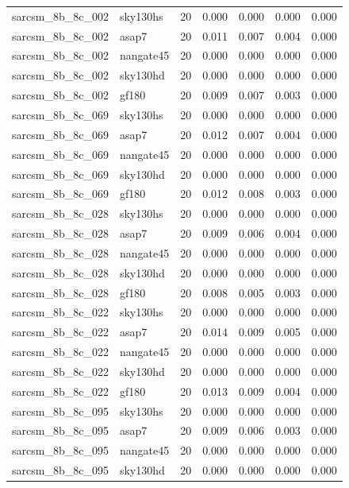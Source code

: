 \begin{tabular}{llrrrrr}
sarcsm\_8b\_8c\_002 & sky130hs & 20 & 0.000 & 0.000 & 0.000 & 0.000 \\
sarcsm\_8b\_8c\_002 & asap7 & 20 & 0.011 & 0.007 & 0.004 & 0.000 \\
sarcsm\_8b\_8c\_002 & nangate45 & 20 & 0.000 & 0.000 & 0.000 & 0.000 \\
sarcsm\_8b\_8c\_002 & sky130hd & 20 & 0.000 & 0.000 & 0.000 & 0.000 \\
sarcsm\_8b\_8c\_002 & gf180 & 20 & 0.009 & 0.007 & 0.003 & 0.000 \\
sarcsm\_8b\_8c\_069 & sky130hs & 20 & 0.000 & 0.000 & 0.000 & 0.000 \\
sarcsm\_8b\_8c\_069 & asap7 & 20 & 0.012 & 0.007 & 0.004 & 0.000 \\
sarcsm\_8b\_8c\_069 & nangate45 & 20 & 0.000 & 0.000 & 0.000 & 0.000 \\
sarcsm\_8b\_8c\_069 & sky130hd & 20 & 0.000 & 0.000 & 0.000 & 0.000 \\
sarcsm\_8b\_8c\_069 & gf180 & 20 & 0.012 & 0.008 & 0.003 & 0.000 \\
sarcsm\_8b\_8c\_028 & sky130hs & 20 & 0.000 & 0.000 & 0.000 & 0.000 \\
sarcsm\_8b\_8c\_028 & asap7 & 20 & 0.009 & 0.006 & 0.004 & 0.000 \\
sarcsm\_8b\_8c\_028 & nangate45 & 20 & 0.000 & 0.000 & 0.000 & 0.000 \\
sarcsm\_8b\_8c\_028 & sky130hd & 20 & 0.000 & 0.000 & 0.000 & 0.000 \\
sarcsm\_8b\_8c\_028 & gf180 & 20 & 0.008 & 0.005 & 0.003 & 0.000 \\
sarcsm\_8b\_8c\_022 & sky130hs & 20 & 0.000 & 0.000 & 0.000 & 0.000 \\
sarcsm\_8b\_8c\_022 & asap7 & 20 & 0.014 & 0.009 & 0.005 & 0.000 \\
sarcsm\_8b\_8c\_022 & nangate45 & 20 & 0.000 & 0.000 & 0.000 & 0.000 \\
sarcsm\_8b\_8c\_022 & sky130hd & 20 & 0.000 & 0.000 & 0.000 & 0.000 \\
sarcsm\_8b\_8c\_022 & gf180 & 20 & 0.013 & 0.009 & 0.004 & 0.000 \\
sarcsm\_8b\_8c\_095 & sky130hs & 20 & 0.000 & 0.000 & 0.000 & 0.000 \\
sarcsm\_8b\_8c\_095 & asap7 & 20 & 0.009 & 0.006 & 0.003 & 0.000 \\
sarcsm\_8b\_8c\_095 & nangate45 & 20 & 0.000 & 0.000 & 0.000 & 0.000 \\
sarcsm\_8b\_8c\_095 & sky130hd & 20 & 0.000 & 0.000 & 0.000 & 0.000 \\

\end{tabular}
